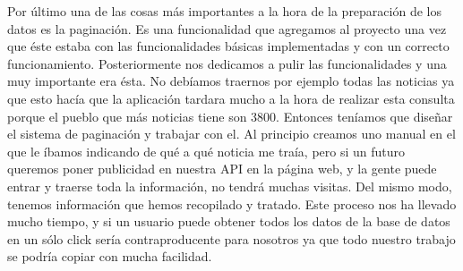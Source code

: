 Por último una de las cosas más importantes a la hora de la preparación de los datos es la paginación. Es una funcionalidad que agregamos al proyecto una vez que éste estaba con las funcionalidades básicas implementadas y con un correcto funcionamiento. Posteriormente nos dedicamos a pulir las funcionalidades y una muy importante era ésta. No debíamos traernos por ejemplo todas las noticias ya que esto hacía que la aplicación tardara mucho a la hora de realizar esta consulta porque el pueblo que más noticias tiene son 3800. Entonces teníamos que diseñar el sistema de paginación y trabajar con el. Al principio creamos uno manual en el que le íbamos indicando de qué a qué noticia me traía, pero si un futuro queremos poner publicidad en nuestra API en la página web, y la gente puede entrar y traerse toda la información, no tendrá muchas visitas. Del mismo modo, tenemos información que hemos recopilado y tratado. Este proceso nos ha llevado mucho tiempo, y si un usuario puede obtener todos los datos de la base de datos en un sólo click sería contraproducente para nosotros ya que todo nuestro trabajo se podría copiar con mucha facilidad.

